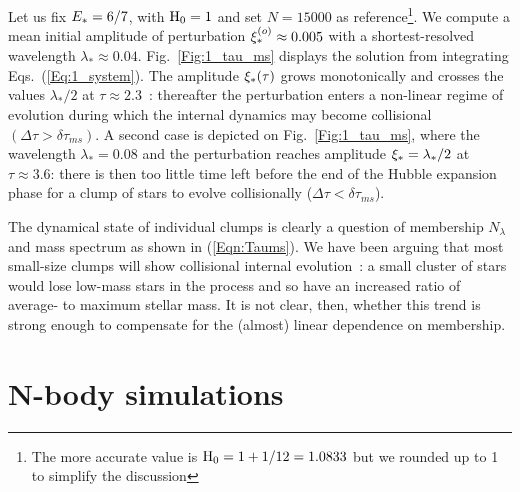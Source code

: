 Let us fix $E_\ast = 6/7$, with ${\textrm{H}}_0 = 1$ and set $N = 15 000$ as reference\footnote{The more accurate value is ${\textrm{H}}_0 = 1 + 1/12 = 1.0833$ but we rounded up to 1 to simplify the discussion}. We compute a mean initial amplitude of perturbation $\xi_\ast^{(o)} \approx 0.005 $ with a shortest-resolved wavelength $\lambda_\ast \approx 0.04$. Fig.~\ref{Fig:1_tau_ms} displays the solution from integrating Eqs.~(\ref{Eq:1_system}). The amplitude $\xi_\ast(\tau)$ grows monotonically and crosses the values $\lambda_\ast/2$ at $\tau \approx 2.3$~: thereafter the perturbation enters a non-linear regime of evolution during which the internal dynamics may become collisional $( \Delta\tau > \delta\tau_{ms})$. A second case is depicted on Fig.~\ref{Fig:1_tau_ms}, where the wavelength $\lambda_\ast = 0.08$ and the perturbation reaches amplitude $\xi_\ast = \lambda_\ast/2$ at $\tau \approx 3.6$: there is then too little time left before the end of the Hubble expansion phase for a clump of stars to evolve collisionally ($\Delta\tau < \delta\tau_{ms}$). 





The dynamical state of individual clumps is clearly a question of membership $N_\lambda$ and mass spectrum as shown in (\ref{Eqn:Taums}). We have been arguing that most small-size clumps will show collisional internal evolution~: a small cluster of stars would lose low-mass stars in the process and so have an increased ratio of average-    to maximum stellar mass. It is not clear, then, whether this trend is strong enough to compensate for the (almost) linear dependence on membership. 






\section{N-body simulations}

